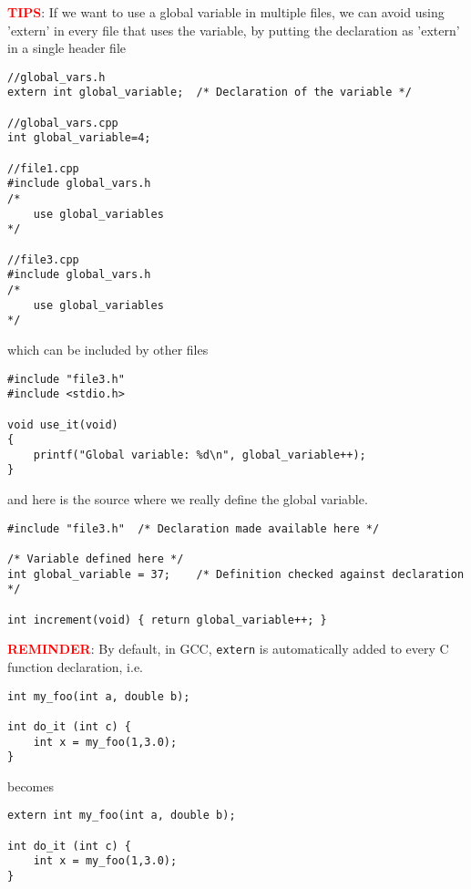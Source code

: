 \textcolor{red}{\bf TIPS}: If we want to use a global variable in multiple files, we can avoid
using 'extern' in every file that uses the variable, 
by putting the declaration as 'extern' in a single header file
\begin{verbatim}
//global_vars.h
extern int global_variable;  /* Declaration of the variable */

//global_vars.cpp
int global_variable=4;

//file1.cpp
#include global_vars.h
/*
	use global_variables
*/

//file3.cpp
#include global_vars.h
/*
	use global_variables
*/

\end{verbatim}
which can be included by other files
\begin{verbatim}
#include "file3.h"
#include <stdio.h>

void use_it(void)
{
    printf("Global variable: %d\n", global_variable++);
}
\end{verbatim}
and here is the source where we really define the global variable.
\begin{verbatim}
#include "file3.h"  /* Declaration made available here */

/* Variable defined here */
int global_variable = 37;    /* Definition checked against declaration */

int increment(void) { return global_variable++; }
\end{verbatim}

\textcolor{red}{\bf REMINDER}: By default, in GCC, \verb!extern! is automatically added to
every C function declaration, i.e.
\begin{lstlisting}
int my_foo(int a, double b);

int do_it (int c) {
    int x = my_foo(1,3.0);
}
\end{lstlisting}
becomes
\begin{lstlisting}
extern int my_foo(int a, double b);

int do_it (int c) {
    int x = my_foo(1,3.0);
}
\end{lstlisting}

